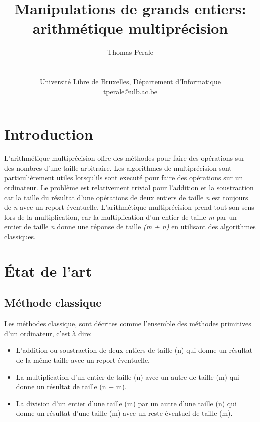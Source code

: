 \documentclass[letterpaper]{article}
\title{Manipulations de grands entiers: arithmétique multiprécision}
\author{Thomas Perale\\
    \mbox{}\\\\
    Université Libre de Bruxelles, Département d'Informatique\\
    tperale@ulb.ac.be\\
}
\begin{document}
\maketitle

\begin{abstract}

\end{abstract}

\section{Introduction}

L'arithmétique multiprécision offre des méthodes pour faire des opérations sur
des nombres d'une taille arbitraire.
Les algorithmes de multiprécision sont particulièrement utiles lorsqu'ils sont
executé pour faire des opérations sur un ordinateur.
Le problème est relativement trivial pour l'addition et la soustraction car
la taille du résultat d'une opérations de deux entiers de taille \emph{n} est
toujours de \emph{n} avec un report éventuelle.
L'arithmétique multiprécision prend tout son sens lors de la multiplication,
car la multiplication d'un entier de taille \emph{m} par un entier de taille
\emph{n} donne une réponse de taille \emph{(m + n)} en utilisant des
algorithmes classiques\cite{knuth1997aocp}.

\section{État de l'art}

\subsection{Méthode classique}

Les méthodes classique, sont décrites comme l'ensemble des méthodes primitives
d'un ordinateur\cite{knuth1997aocp}, c'est à dire:

\begin{itemize}
    \item L'addition ou soustraction de deux entiers de taille (n) qui donne
        un résultat de la même taille avec un report éventuelle.
    \item La multiplication d'un entier de taille (n) avec un autre de taille
        (m) qui donne un résultat de taille (n + m).
    \item La division d'un entier d'une taille (m) par un autre d'une taille
        (n) qui donne un résultat d'une taille (m) avec un reste éventuel de
        taille (m).
\end{itemize}
\end{document}

